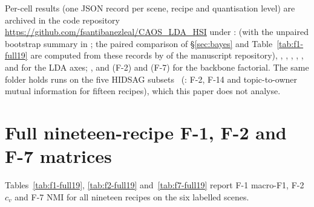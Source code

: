 \documentclass[journal,a4paper,10pt]{IEEEtran}
\begin{document}
{\raggedright
Per-cell results (one JSON record per scene, recipe and quantisation
level) are archived in the code repository
\url{https://github.com/fsantibanezleal/CAOS_LDA_HSI} under
:  (with the unpaired
bootstrap summary in ; the paired
comparison of \S\ref{sec:bayes} and Table~\ref{tab:f1-full19} are
computed from these records by 
of the manuscript repository),
, , ,
, ,
 and  for the LDA
axes; ,
 and  (F-2) and
 (F-7) for the backbone factorial. The same folder
holds runs on the five HIDSAG subsets~\cite{hidsag2023}
(: F-2, F-14 and topic-to-owner mutual information for
fifteen recipes), which this paper does not analyse.\par}

\appendices
\section{Full nineteen-recipe F-1, F-2 and F-7 matrices}
\label{app:full-matrix}

Tables~\ref{tab:f1-full19}, \ref{tab:f2-full19} and~\ref{tab:f7-full19}
report F-1 macro-F1, F-2 $c_v$ and F-7 NMI for all nineteen recipes on
the six labelled scenes.
\end{document}
